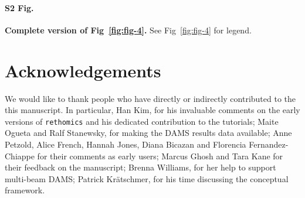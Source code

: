 \documentclass[10pt,letterpaper]{article}\usepackage[]{graphicx}\usepackage[]{color}
\begin{document}
\paragraph*{S2 Fig.}
\label{S2-Fig}
{\bf Complete version of Fig~\ref{fig:fig-4}.}
See Fig~\ref{fig:fig-4} for legend.

\section*{Acknowledgements}
We would like to thank people who have directly or indirectly contributed to the this manuscript.
In particular, Han Kim, for his invaluable comments on the early versions of \texttt{rethomics} and his dedicated contribution to the tutorials;
Maite Ogueta and Ralf Stanewsky, for making the DAMS results data available;
Anne Petzold, Alice French, Hannah Jones, Diana Bicazan and Florencia Fernandez-Chiappe for their comments as early users;
Marcus Ghosh and Tara Kane for their feedback on the manuscript;
Brenna Williams, for her help to support multi-beam DAMS;
Patrick Kr{\"a}tschmer, for his time discussing the conceptual framework.




\nolinenumbers

%
%
% 



{}


\end{document}
